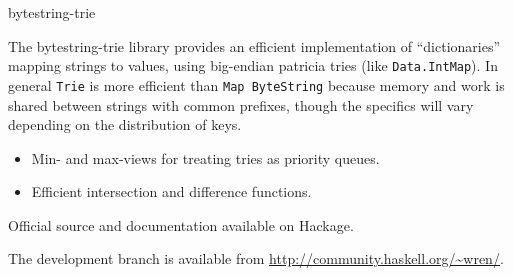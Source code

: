 \begin{hcarentry}[new]{bytestring-trie}
\makeheader

The bytestring-trie library provides an efficient implementation of ``dictionaries'' mapping strings to values, using big-endian patricia tries (like \texttt{Data.IntMap}). In general \texttt{Trie} is more efficient than \texttt{Map ByteString} because memory and work is shared between strings with common prefixes, though the specifics will vary depending on the distribution of keys.

\FuturePlans
\begin{itemize}
\item Min- and max-views for treating tries as priority queues.
\item Efficient intersection and difference functions.
\end{itemize}

\FurtherReading
\begin{compactitem}
\item Official source and documentation available on Hackage.
\item The development branch is available from \url{http://community.haskell.org/~wren/}.
\end{compactitem}
\end{hcarentry}
